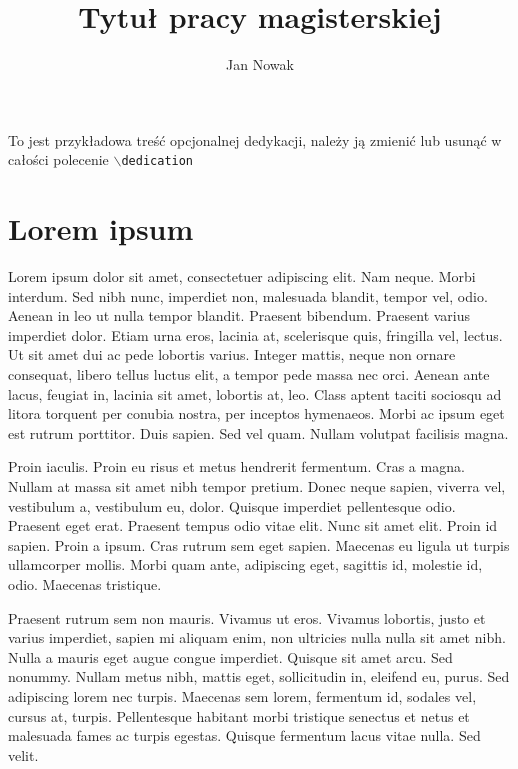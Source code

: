\documentclass[printmode,mgr,pl]{mgr}
\title{Tytuł pracy magisterskiej}
\author{Jan Nowak}
\begin{document}

\maketitle %

\dedication{6cm}{To jest przykładowa treść opcjonalnej dedykacji,
  należy ją zmienić lub usunąć w całości polecenie
  \texttt{$\backslash$dedication}}

\tableofcontents %

\chapter{Lorem ipsum}
Lorem ipsum dolor sit amet, consectetuer adipiscing elit. Nam
neque. Morbi interdum. Sed nibh nunc, imperdiet non, malesuada
blandit, tempor vel, odio. Aenean in leo ut nulla tempor
blandit. Praesent bibendum. Praesent varius imperdiet dolor. Etiam
urna eros, lacinia at, scelerisque quis, fringilla vel, lectus. Ut sit
amet dui ac pede lobortis varius. Integer mattis, neque non ornare
consequat, libero tellus luctus elit, a tempor pede massa nec
orci. Aenean ante lacus, feugiat in, lacinia sit amet, lobortis at,
leo. Class aptent taciti sociosqu ad litora torquent per conubia
nostra, per inceptos hymenaeos. Morbi ac ipsum eget est rutrum
porttitor. Duis sapien. Sed vel quam. Nullam volutpat facilisis magna.

Proin iaculis. Proin eu risus et metus hendrerit fermentum. Cras a
magna. Nullam at massa sit amet nibh tempor pretium. Donec neque
sapien, viverra vel, vestibulum a, vestibulum eu, dolor. Quisque
imperdiet pellentesque odio. Praesent eget erat. Praesent tempus odio
vitae elit. Nunc sit amet elit. Proin id sapien. Proin a ipsum. Cras
rutrum sem eget sapien. Maecenas eu ligula ut turpis ullamcorper
mollis. Morbi quam ante, adipiscing eget, sagittis id, molestie id,
odio. Maecenas tristique.

Praesent rutrum sem non mauris. Vivamus ut eros. Vivamus lobortis,
justo et varius imperdiet, sapien mi aliquam enim, non ultricies nulla
nulla sit amet nibh. Nulla a mauris eget augue congue
imperdiet. Quisque sit amet arcu. Sed nonummy. Nullam metus nibh,
mattis eget, sollicitudin in, eleifend eu, purus. Sed adipiscing lorem
nec turpis. Maecenas sem lorem, fermentum id, sodales vel, cursus at,
turpis. Pellentesque habitant morbi tristique senectus et netus et
malesuada fames ac turpis egestas. Quisque fermentum lacus vitae
nulla. Sed velit.
\end{document}

